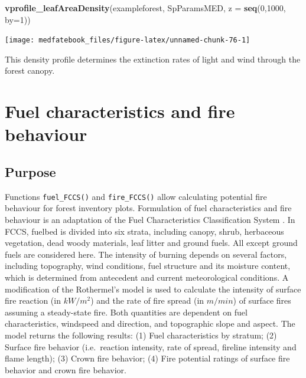 \documentclass[]{book}
\newenvironment{Shaded}{\begin{snugshade}}{\end{snugshade}}
\newcommand{\KeywordTok}[1]{\textcolor[rgb]{0.13,0.29,0.53}{\textbf{#1}}}
\newcommand{\DataTypeTok}[1]{\textcolor[rgb]{0.13,0.29,0.53}{#1}}
\newcommand{\DecValTok}[1]{\textcolor[rgb]{0.00,0.00,0.81}{#1}}
\newcommand{\NormalTok}[1]{#1}
\begin{document}
\begin{Shaded}
\begin{Highlighting}[]
\KeywordTok{vprofile_leafAreaDensity}\NormalTok{(exampleforest, SpParamsMED, }\DataTypeTok{z =} \KeywordTok{seq}\NormalTok{(}\DecValTok{0}\NormalTok{,}\DecValTok{1000}\NormalTok{, }\DataTypeTok{by=}\DecValTok{1}\NormalTok{))}
\end{Highlighting}
\end{Shaded}

\begin{center}\texttt{[image: medfatebook\_files/figure-latex/unnamed-chunk-76-1]} \end{center}

This density profile determines the extinction rates of light and wind
through the forest canopy.

\chapter{Fuel characteristics and fire
behaviour}\label{fuel-characteristics-and-fire-behaviour}

\section{Purpose}\label{purpose-1}

Functions \texttt{fuel\_FCCS()} and \texttt{fire\_FCCS()} allow
calculating potential fire behaviour for forest inventory plots.
Formulation of fuel characteristics and fire behaviour is an adaptation
of the Fuel Characteristics Classification System
\citep[FCCS;][]{Prichard2013}. In FCCS, fuelbed is divided into six
strata, including canopy, shrub, herbaceous vegetation, dead woody
materials, leaf litter and ground fuels. All except ground fuels are
considered here. The intensity of burning depends on several factors,
including topography, wind conditions, fuel structure and its moisture
content, which is determined from antecedent and current meteorological
conditions. A modification of the Rothermel's
\citeyearpar{Rothermel1972} model is used to calculate the intensity of
surface fire reaction (in \(kW/m^2\)) and the rate of fire spread (in
\(m/min\)) of surface fires assuming a steady-state fire. Both
quantities are dependent on fuel characteristics, windspeed and
direction, and topographic slope and aspect. The model returns the
following results: (1) Fuel characteristics by stratum; (2) Surface fire
behavior (i.e.~reaction intensity, rate of spread, fireline intensity
and flame length); (3) Crown fire behavior; (4) Fire potential ratings
of surface fire behavior and crown fire behavior.
\end{document}
